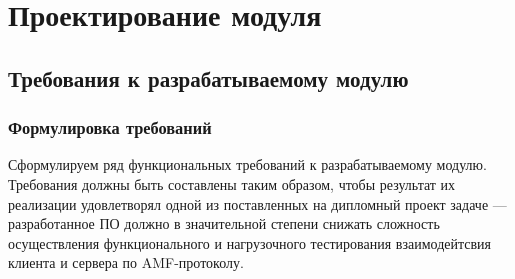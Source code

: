 \chapter{Проектирование модуля}

\section{Требования к разрабатываемому модулю}

\subsection{Формулировка требований}
Сформулируем ряд функциональных требований к разрабатываемому модулю. Требования должны быть составлены 
таким образом, чтобы результат их реализации удовлетворял одной из поставленных на дипломный проект задаче ---
разработанное ПО должно в значительной степени снижать сложность осуществления функционального
и нагрузочного тестирования взаимодейтсвия клиента и сервера по AMF-протоколу.

